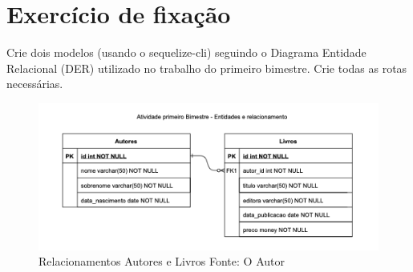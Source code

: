 \section{Exercício de fixação}

Crie dois modelos (usando o sequelize-cli) seguindo o Diagrama Entidade Relacional (DER) utilizado no trabalho do primeiro bimestre. Crie todas as rotas necessárias.

\begin{figure}[H]
	\centering
	\includegraphics[scale=0.7]{imagens/der.png}
	\caption{
		Relacionamentos Autores e Livros
		Fonte: O Autor
	}
	\label{fig:der}
\end{figure}

%
%

